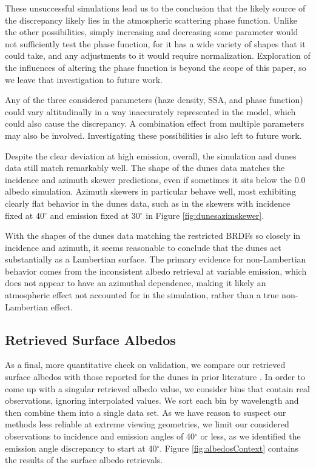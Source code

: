 \documentclass[twocolumn,linenumbers]{aastex631}
\begin{document}
These unsuccessful simulations lead us to the conclusion that the likely source of the discrepancy likely lies in the atmospheric scattering phase function. Unlike the other possibilities, simply increasing and decreasing some parameter would not sufficiently test the phase function, for it has a wide variety of shapes that it could take, and any adjustments to it would require normalization. Exploration of the influences of altering the phase function is beyond the scope of this paper, so we leave that investigation to future work.

Any of the three considered parameters (haze density, SSA, and phase function) could vary altitudinally in a way inaccurately represented in the model, which could also cause the discrepancy. A combination effect from multiple parameters may also be involved. Investigating these possibilities is also left to future work.

Despite the clear deviation at high emission, overall, the simulation and dunes data still match remarkably well. The shape of the dunes data matches the incidence and azimuth skewer predictions, even if sometimes it sits below the 0.0 albedo simulation. Azimuth skewers in particular behave well, most exhibiting clearly flat behavior in the dunes data, such as in the skewers with incidence fixed at 40$^{\circ}$ and emission fixed at 30$^{\circ}$ in Figure \ref{fig:dunesazimskewer}.

With the shapes of the dunes data matching the restricted BRDFs so closely in incidence and azimuth, it seems reasonable to conclude that the dunes act substantially as a Lambertian surface. The primary evidence for non-Lambertian behavior comes from the inconsistent albedo retrieval at variable emission, which does not appear to have an azimuthal dependence, making it likely an atmospheric effect not accounted for in the simulation, rather than a true non-Lambertian effect.

\subsection{Retrieved Surface Albedos} \label{sec:albedoC}

As a final, more quantitative check on validation, we compare our retrieved surface albedos with those reported for the dunes in prior literature \citep{McCord2006, Bonnefoy2016, Solomonidou2018, Brossier2018, EsSayeh2023}. In order to come up with a singular retrieved albedo value, we consider bins that contain real observations, ignoring interpolated values. We sort each bin by wavelength and then combine them into a single data set. As we have reason to suspect our methods less reliable at extreme viewing geometries, we limit our considered observations to incidence and emission angles of 40$^{\circ}$ or less, as we identified the emission angle discrepancy to start at 40$^{\circ}$. Figure \ref{fig:albedosContext} contains the results of the surface albedo retrievals. 
\end{document}
